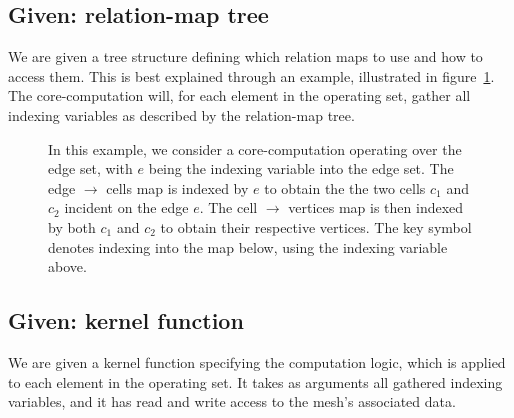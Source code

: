 \subsection{Given: relation-map tree}
We are given a tree structure defining which relation maps to use and how to access them. This is best explained through an example, illustrated in figure~\ref{fig:relation-tree}. The core-computation will, for each element in the operating set, gather all indexing variables as described by the relation-map tree.


\begin{figure}
    \newcommand{\keyicon}{}

    \caption{
    In this example, we consider a core-computation operating over the edge set, with $e$ being the indexing variable into the edge set.
    The edge $\rightarrow$ cells map is indexed by $e$ to obtain the the two cells $c_1$ and $c_2$ incident on the edge $e$. The cell $\rightarrow$ vertices map is then indexed by both $c_1$ and $c_2$ to obtain their respective vertices. The key symbol denotes indexing into the map below, using the indexing variable above.
    }
    \label{fig:relation-tree}
\end{figure}


\subsection{Given: kernel function}
We are given a kernel function specifying the computation logic, which is applied to each element in the operating set. It takes as arguments all gathered indexing variables, and it has read and write access to the mesh's associated data.

